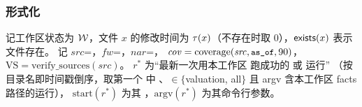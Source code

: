 \subsubsection{形式化}

记工作区状态为 $\mathcal{W}$，文件 $x$ 的修改时间为 $\tau(x)$（不存在时取 $0$），$\mathsf{exists}(x)$ 表示文件存在。
记 $\mathit{src}$=，$\mathit{fw}$=，$\mathit{nar}$=，
$\mathit{cov}=\mathrm{coverage}(\mathit{src}, \texttt{\small as\_of}, 90)$，$\mathrm{VS}=\mathrm{verify\_sources}(\mathit{src})$。
$r^\ast$ 为“最新一次用本工作区  跑成功的  或  运行”
（按目录名即时间戳倒序，取第一个  中 、$\in\{$valuation, all$\}$ 且 argv 含本工作区 facts 路径的运行），
$\mathrm{start}(r^\ast)$ 为其 ，$\mathrm{argv}(r^\ast)$ 为其命令行参数。

